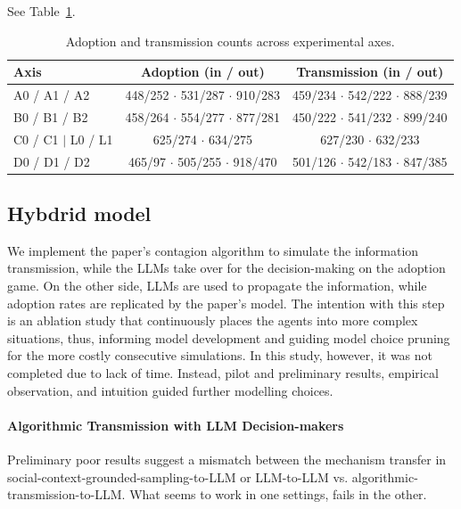 \documentclass[11pt]{article}
\begin{document}
See Table~\ref{tab:adoption-transmission}.

\begin{table}[h!]
\centering
\begin{tabular}{lcc}
\hline
\textbf{Axis} & \textbf{Adoption (in / out)} & \textbf{Transmission (in / out)} \\
\hline
A0 / A1 / A2
& 448/252 $\cdot$ 531/287 $\cdot$ 910/283
& 459/234 $\cdot$ 542/222 $\cdot$ 888/239 \\

B0 / B1 / B2
& 458/264 $\cdot$ 554/277 $\cdot$ 877/281
& 450/222 $\cdot$ 541/232 $\cdot$ 899/240 \\

C0 / C1 $|$ L0 / L1 
& 625/274 $\cdot$ 634/275
& 627/230 $\cdot$ 632/233 \\

D0 / D1 / D2
& 465/97 $\cdot$ 505/255 $\cdot$ 918/470
& 501/126 $\cdot$ 542/183 $\cdot$ 847/385 \\
\hline
\end{tabular}
\caption{Adoption and transmission counts across experimental axes.}
\label{tab:adoption-transmission}
\end{table}

\subsection{Hybdrid model}

We implement the paper's contagion algorithm to simulate the information transmission, while the LLMs take over for the decision-making on the adoption game. On the other side, LLMs are used to propagate the information, while adoption rates are replicated by the paper's model. The intention with this step is an ablation study that continuously places the agents into more complex situations, thus, informing model development and guiding model choice pruning for the more costly consecutive simulations. In this study, however, it was not completed due to lack of time. Instead, pilot and preliminary results, empirical observation, and intuition guided further modelling choices.

\paragraph{Algorithmic Transmission with LLM Decision-makers}

Preliminary poor results suggest a mismatch between the mechanism transfer in social-context-grounded-sampling-to-LLM or LLM-to-LLM vs. algorithmic-transmission-to-LLM. What seems to work in one settings, fails in the other.
\end{document}
